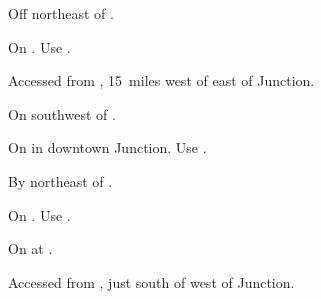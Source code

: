 
\begin{LocationList}

Off  northeast of .

On .
Use  .

Accessed from , 15~miles west of  east of Junction.

On  southwest of .

On  in downtown Junction.
Use  .

By  northeast of .

\Location{\TruckService \Service}
On .
Use  .

\Location{\TruckStop \Gas \Rest \Weigh}
On  at  .

Accessed from , just south of  west of Junction.

\end{LocationList}
